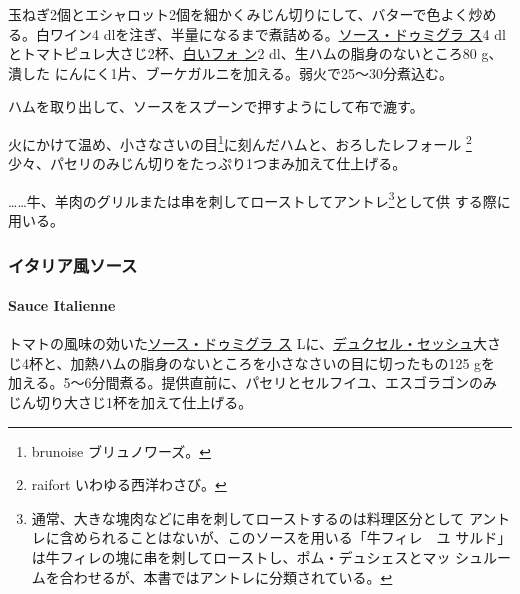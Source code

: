 \begin{recette}
  

玉ねぎ2個とエシャロット2個を細かくみじん切りにして、バターで色よく炒め
る。白ワイン4
dlを注ぎ、半量になるまで煮詰める。\protect\hyperlink{sauce-demi-glace}{ソース・ドゥミグラ
ス}4
dlとトマトピュレ大さじ2杯、\protect\hyperlink{fonds-blanc-ordinaire}{白いフォ
ン}2 dl、生ハムの脂身のないところ80 g、潰した
にんにく1片、ブーケガルニを加える。弱火で25〜30分煮込む。

ハムを取り出して、ソースをスプーンで押すようにして布で漉す。

火にかけて温め、小さなさいの目\footnote{brunoise ブリュノワーズ。}に刻んだハムと、おろしたレフォール
\footnote{raifort いわゆる西洋わさび。}少々、パセリのみじん切りをたっぷり1つまみ加えて仕上げる。

\ldots{}\ldots{}牛、羊肉のグリルまたは串を刺してローストしてアントレ\footnote{通常、大きな塊肉などに串を刺してローストするのは料理区分として
  アントレに含められることはないが、このソースを用いる「牛フィレ　ユ
  サルド」は牛フィレの塊に串を刺してローストし、ポム・デュシェスとマッ
  シュルームを合わせるが、本書ではアントレに分類されている。}として供
する際に用いる。

\maeaki

\hypertarget{ux30a4ux30bfux30eaux30a2ux98a8ux30bdux30fcux30b9}{%
\subsubsection{イタリア風ソース}\label{ux30a4ux30bfux30eaux30a2ux98a8ux30bdux30fcux30b9}}

\hypertarget{sauce-italienne}{%
\paragraph{Sauce Italienne}\label{sauce-italienne}}

   

トマトの風味の効いた\protect\hyperlink{sauce-demi-glace}{ソース・ドゥミグラ
ス}\troisquarts{} Lに、\href{}{デュクセル・セッシュ}大さ
じ4杯と、加熱ハムの脂身のないところを小さなさいの目に切ったもの125 gを
加える。5〜6分間煮る。提供直前に、パセリとセルフイユ、エスゴラゴンのみ
じん切り大さじ1杯を加えて仕上げる。


\end{recette}
